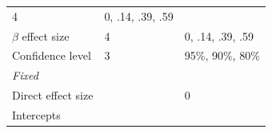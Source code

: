\documentclass[10,a4paperpaper,]{article}
\begin{document}
\begin{longtable}[]{@{}lll@{}}
\begin{minipage}[t]{0.05\columnwidth}
4\strut
\end{minipage} & \begin{minipage}[t]{0.37\columnwidth}\raggedright\strut
0, .14, .39, .59\strut
\end{minipage}\tabularnewline
\begin{minipage}[t]{0.18\columnwidth}\raggedright\strut
\(\beta\) effect size\strut
\end{minipage} & \begin{minipage}[t]{0.05\columnwidth}\raggedright\strut
4\strut
\end{minipage} & \begin{minipage}[t]{0.37\columnwidth}\raggedright\strut
0, .14, .39, .59\strut
\end{minipage}\tabularnewline
\begin{minipage}[t]{0.18\columnwidth}\raggedright\strut
Confidence level\strut
\end{minipage} & \begin{minipage}[t]{0.05\columnwidth}\raggedright\strut
3\strut
\end{minipage} & \begin{minipage}[t]{0.37\columnwidth}\raggedright\strut
95\%, 90\%, 80\%\strut
\end{minipage}\tabularnewline
\begin{minipage}[t]{0.18\columnwidth}\raggedright\strut
\emph{Fixed}\strut
\end{minipage} & \begin{minipage}[t]{0.05\columnwidth}\raggedright\strut
\strut
\end{minipage} & \begin{minipage}[t]{0.37\columnwidth}\raggedright\strut
\strut
\end{minipage}\tabularnewline
\begin{minipage}[t]{0.18\columnwidth}\raggedright\strut
Direct effect size\strut
\end{minipage} & \begin{minipage}[t]{0.05\columnwidth}\raggedright\strut
\strut
\end{minipage} & \begin{minipage}[t]{0.37\columnwidth}\raggedright\strut
0\strut
\end{minipage}\tabularnewline
\begin{minipage}[t]{0.18\columnwidth}\raggedright\strut
Intercepts\strut
\end{minipage} & \begin{minipage}[t]{0.05\columnwidth}\raggedright\strut
\strut

\end{minipage}
\end{longtable}
\end{document}

